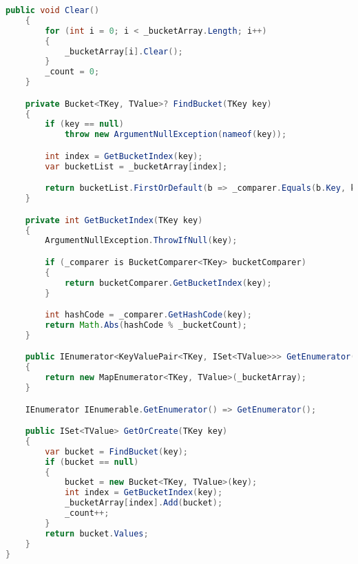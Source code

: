 \documentclass[12pt]{article}
\begin{document}
\begin{lstlisting}[language=Java]
    public void Clear()
    {
        for (int i = 0; i < _bucketArray.Length; i++)
        {
            _bucketArray[i].Clear();
        }
        _count = 0;
    }

    private Bucket<TKey, TValue>? FindBucket(TKey key)
    {
        if (key == null)
            throw new ArgumentNullException(nameof(key));

        int index = GetBucketIndex(key);
        var bucketList = _bucketArray[index];

        return bucketList.FirstOrDefault(b => _comparer.Equals(b.Key, key));
    }

    private int GetBucketIndex(TKey key)
    {
        ArgumentNullException.ThrowIfNull(key);

        if (_comparer is BucketComparer<TKey> bucketComparer)
        {
            return bucketComparer.GetBucketIndex(key);
        }

        int hashCode = _comparer.GetHashCode(key);
        return Math.Abs(hashCode % _bucketCount);
    }

    public IEnumerator<KeyValuePair<TKey, ISet<TValue>>> GetEnumerator()
    {
        return new MapEnumerator<TKey, TValue>(_bucketArray);
    }

    IEnumerator IEnumerable.GetEnumerator() => GetEnumerator();

    public ISet<TValue> GetOrCreate(TKey key)
    {
        var bucket = FindBucket(key);
        if (bucket == null)
        {
            bucket = new Bucket<TKey, TValue>(key);
            int index = GetBucketIndex(key);
            _bucketArray[index].Add(bucket);
            _count++;
        }
        return bucket.Values;
    }
}

\end{lstlisting}
\end{document}
